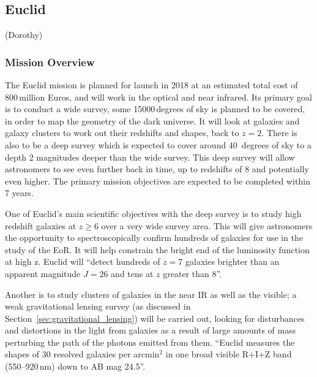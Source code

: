 
\subsection{Euclid} %
\label{sub:euclid}
(Dorothy)

	\subsubsection{Mission Overview} %
	\label{ssub:mission_overview}
		The Euclid mission is planned for launch in 2018\cite[p.~8]{Euclid_Definition_Study_Report} at an estimated total cost of 800\,million Euros, and will work in the optical and near infrared\cite{bbc_euclid}. Its primary goal is to conduct a wide survey, some 15000\,degrees of sky is planned to be covered, in order to map the geometry of the dark universe. It will look at galaxies and galaxy clusters to work out their redshifts and shapes, back to $z=2$. There is also to be a deep survey which is expected to cover around 40\, degrees of sky to a depth 2 magnitudes deeper than the wide survey. This deep survey will allow astronomers to see even further back in time, up to redshifts of 8 and potentially even higher. The primary mission objectives are expected to be completed within 7 years.

		One of Euclid's main scientific objectives with the deep survey is to study high redshift galaxies at $z\ge6$ over a very wide survey area. This will give astronomers the opportunity to spectroscopically confirm hundreds of galaxies for use in the study of the EoR. It will help constrain the bright end of the luminosity function at high z. Euclid will ``detect hundreds of $z=7$ galaxies brighter than an apparent magnitude $J=26$ and tens at $z$ greater than 8''\cite{Euclid_Definition_Study_Report}.

		Another is to study clusters of galaxies in the near IR as well as the visible; a weak gravitational lensing survey (as discussed in Section~\ref{sec:gravitational_lensing}) will be carried out, looking for disturbances and distortions in the light from galaxies as a result of large amounts of mass perturbing the path of the photons emitted from them. ``Euclid measures the shapes of 30 resolved galaxies per arcmin$^2$ in one broad visible R+I+Z band (550--920\,\si{\nano\metre}) down to AB mag 24.5''\cite[p.~9]{Euclid_Definition_Study_Report}.

